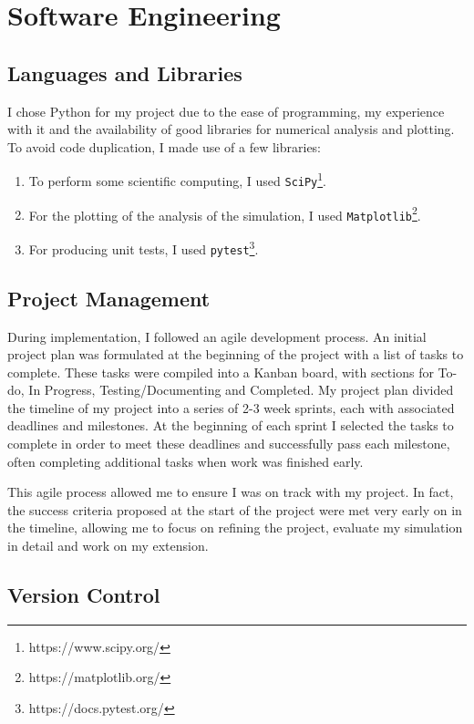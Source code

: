\documentclass[12pt,a4paper,twoside,openright]{report}
\begin{document}
\section{Software Engineering}\label{section:software}

\subsection{Languages and Libraries}

I chose Python for my project due to the ease of programming, my experience with it and the availability of good libraries for numerical analysis and plotting. To avoid code duplication, I made use of a few libraries:

\begin{enumerate}
 	\item To perform some scientific computing, I used \verb|SciPy|\footnote{https://www.scipy.org/}.
	\item For the plotting of the analysis of the simulation, I used \verb|Matplotlib|\footnote{https://matplotlib.org/}. 
	\item For producing unit tests, I used \verb|pytest|\footnote{https://docs.pytest.org/}.
\end{enumerate}

\subsection{Project Management}

During implementation, I followed an agile development process. An initial project plan was formulated at the beginning of the project with a list of tasks to complete. These tasks were compiled into a Kanban board, with sections for To-do, In Progress, Testing/Documenting and Completed. My project plan divided the timeline of my project into a series of 2-3 week sprints, each with associated deadlines and milestones. At the beginning of each sprint I selected the tasks to complete in order to meet these deadlines and successfully pass each milestone, often completing additional tasks when work was finished early.

This agile process allowed me to ensure I was on track with my project. In fact, the success criteria proposed at the start of the project were met very early on in the timeline, allowing me to focus on refining the project, evaluate my simulation in detail and work on my extension. 

\subsection{Version Control}
\end{document}

